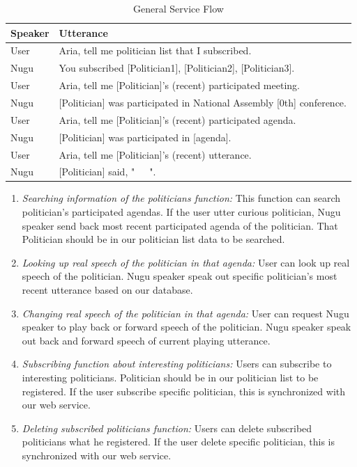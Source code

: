 \documentclass[conference]{IEEEtran}
\begin{document}
\begin{enumerate}
        
\begin{table}[htbp]
  \renewcommand{\arraystretch}{1.5}
\caption{General Service Flow}
\begin{center}
\begin{tabular}{|p{1cm}|p{8cm}|}
\hline
\textbf{Speaker} & \textbf{Utterance}\\
\hline
User & Aria, tell me politician list that I subscribed. \\
\hline
Nugu & You subscribed [Politician1], [Politician2], [Politician3]. \\
\hline
User & Aria, tell me [Politician]'s (recent) participated meeting.\\
\hline
Nugu & [Politician] was participated in National Assembly [0th] conference.\\
\hline
User & Aria, tell me [Politician]'s (recent) participated agenda. \\
\hline
Nugu & [Politician] was participated in [agenda].\\
\hline
User & Aria, tell me [Politician]'s (recent) utterance.\\
\hline
Nugu & [Politician] said, "~~~".\\
\hline
\end{tabular}
\label{tab2}
\end{center}
\end{table}
        
\begin{enumerate}
        \item \textit{Searching information of the politicians function:} This function can search politician’s participated agendas. If the user utter curious politician, Nugu speaker send back most recent participated agenda of the politician. That Politician should be in our politician list data to be searched.\\
        \item \textit{Looking up real speech of the politician in that agenda:} User can look up real speech of the politician. Nugu speaker speak out specific politician’s most recent utterance based on our database.\\
        \item \textit{Changing real speech of the politician in that agenda:} User can request Nugu speaker to play back or forward speech of the politician. Nugu speaker speak out back and forward speech of current playing utterance.\\
        \item \textit {Subscribing function about interesting politicians:} Users can subscribe to interesting politicians.  Politician should be in our politician list to be registered. If the user subscribe specific politician, this is synchronized with our web service.\\
        \item \textit {Deleting subscribed politicians function:} Users can delete subscribed politicians what he registered. If the user delete specific politician, this is synchronized with our web service.\\
           \end{enumerate}
\end{enumerate}
    
\end{document}
